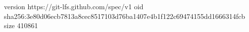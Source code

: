 version https://git-lfs.github.com/spec/v1
oid sha256:3e80d06ecb7813a8cec8517103d76ba1407e4b1f122c69474155dd1666314fcb
size 410861
